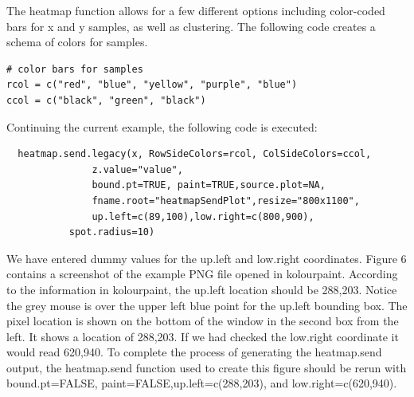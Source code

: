 \documentclass[]{article}
\begin{document}
\indent The heatmap function allows for a few different options including color-coded bars for x and y samples, as well as clustering. The following code creates a schema of colors for samples. 
\begin{verbatim}
# color bars for samples
rcol = c("red", "blue", "yellow", "purple", "blue")
ccol = c("black", "green", "black")
\end{verbatim}


\indent Continuing the current example, the following code is executed:
\begin{verbatim}
  heatmap.send.legacy(x, RowSideColors=rcol, ColSideColors=ccol,
               z.value="value",
               bound.pt=TRUE, paint=TRUE,source.plot=NA,
               fname.root="heatmapSendPlot",resize="800x1100",
               up.left=c(89,100),low.right=c(800,900),
	       spot.radius=10)
\end{verbatim}

We have entered dummy values for the up.left and low.right coordinates. Figure 6 contains a screenshot of the example PNG file opened in kolourpaint. According to the information in kolourpaint, the up.left location should be 288,203. Notice the grey mouse is over the upper left blue point for the up.left bounding box. The pixel location is shown on the bottom of the window in the second box from the left. It shows a location of 288,203. If we had checked the low.right coordinate it would read 620,940. To complete the process of generating the heatmap.send output, the heatmap.send function used to create this figure should be rerun with bound.pt=FALSE, paint=FALSE,up.left=c(288,203), and low.right=c(620,940).\newline
\end{document}
